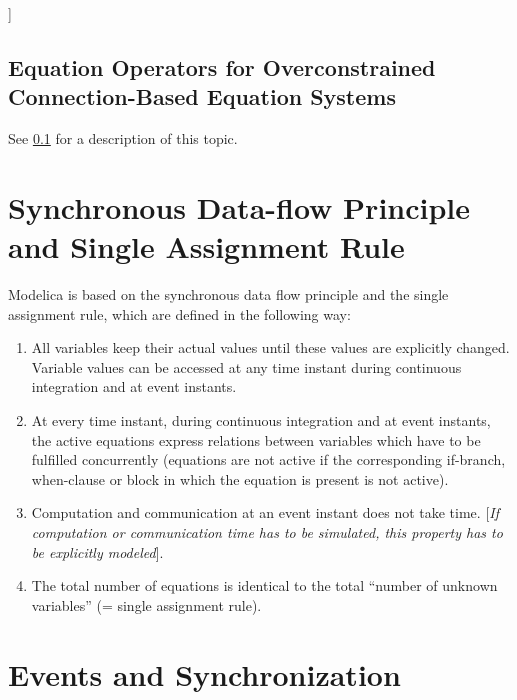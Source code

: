 \documentclass[10pt,a4paper]{report}
\def\doublelabel#1{\label{#1}\hypertarget{#1}{}}
\begin{document}
{]}

\subsection{Equation Operators for Overconstrained Connection-Based Equation Systems}\doublelabel{equation-operators-for-overconstrained-connection-based-equation-systems}

See \ref{equation-operators-for-overconstrained-connection-based-equation-systems} for a description of this topic.

\section{Synchronous Data-flow Principle and Single Assignment Rule}\doublelabel{synchronous-data-flow-principle-and-single-assignment-rule}

Modelica is based on the synchronous data flow principle and the single
assignment rule, which are defined in the following way:

\begin{enumerate}
\item All variables keep their actual values until these values are
explicitly changed. Variable values can be accessed at any time instant
during continuous integration and at event instants.

\item At every time instant, during continuous integration and at event
instants, the active equations express relations between variables which
have to be fulfilled concurrently (equations are not active if the
corresponding if-branch, when-clause or block in which the equation is
present is not active).

\item  Computation and communication at an event instant does not take time.
{[}\emph{If computation or communication time has to be simulated, this
property has to be explicitly modeled}{]}.

\item  The total number of equations is identical to the total ``number of
unknown variables'' (= single assignment rule).
\end{enumerate}

\section{Events and Synchronization}\doublelabel{events-and-synchronization}
\end{document}
